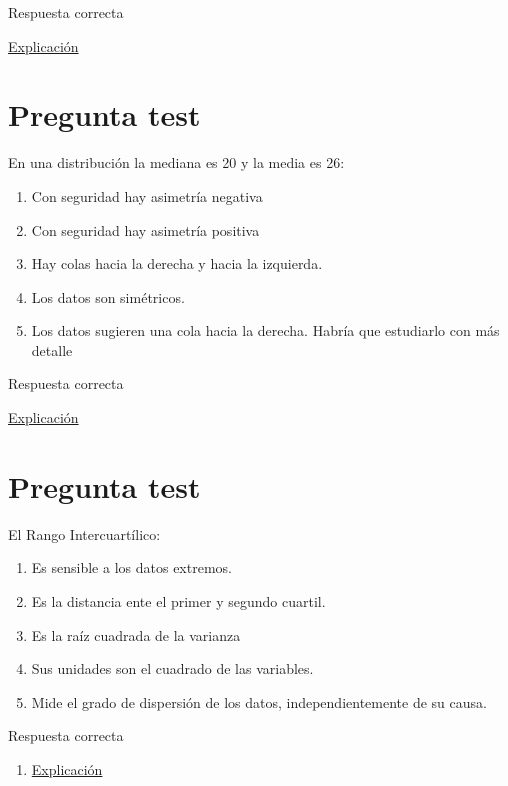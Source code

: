 \documentclass[
]{book}
\providecommand{\tightlist}{%
  \setlength{\itemsep}{0pt}\setlength{\parskip}{0pt}}
\begin{document}
Respuesta correcta

\href{https://1fjmanzano.github.io/bioestadistica/medidas-de-forma.html}{Explicación}

\hypertarget{pregunta-test-89}{%
\section{Pregunta test}\label{pregunta-test-89}}

En una distribución la mediana es 20 y la media es 26:

\begin{enumerate}
\def\labelenumi{\alph{enumi})}
\tightlist
\item
  Con seguridad hay asimetría negativa
\item
  Con seguridad hay asimetría positiva
\item
  Hay colas hacia la derecha y hacia la izquierda.
\item
  Los datos son simétricos.
\item
  Los datos sugieren una cola hacia la derecha. Habría que estudiarlo con más detalle
\end{enumerate}

Respuesta correcta

\href{https://1fjmanzano.github.io/bioestadistica/medidas-de-forma.html}{Explicación}

\hypertarget{pregunta-test-90}{%
\section{Pregunta test}\label{pregunta-test-90}}

El Rango Intercuartílico:

\begin{enumerate}
\def\labelenumi{\alph{enumi})}
\tightlist
\item
  Es sensible a los datos extremos.
\item
  Es la distancia ente el primer y segundo cuartil.
\item
  Es la raíz cuadrada de la varianza
\item
  Sus unidades son el cuadrado de las variables.
\item
  Mide el grado de dispersión de los datos, independientemente de su causa.
\end{enumerate}

Respuesta correcta

\begin{enumerate}
\def\labelenumi{\alph{enumi})}
\setcounter{enumi}{4}
\tightlist
\item
  \href{https://1fjmanzano.github.io/bioestadistica/medidas-de-posicio\%CC\%81n-dispersio\%CC\%81n-y-forma.html\#medidas-de-dispersio\%CC\%81n}{Explicación}
\end{enumerate}
\end{document}

